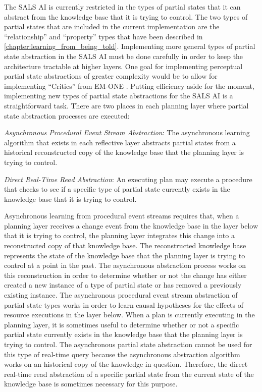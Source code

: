 The SALS AI is currently restricted in the types of partial states
that it can abstract from the knowledge base that it is trying to
control.  The two types of partial states that are included in the
current implementation are the ``relationship'' and ``property'' types
that have been described in
{\mbox{\autoref{chapter:learning_from_being_told}}}.
Implementing more general types of partial state abstraction in the
SALS AI must be done carefully in order to keep the architecture
tractable at higher layers.  One goal for implementing perceptual
partial state abstractions of greater complexity would be to allow for
implementing ``Critics'' from EM-ONE \cite[]{singh:2005b}.  Putting
efficiency aside for the moment, implementing new types of partial
state abstractions for the SALS AI is a straightforward task.  There
are two places in each planning layer where partial state abstraction
processes are executed:
\begin{packed_enumerate}
\item{\emph{Asynchronous Procedural Event Stream Abstraction}: The
  asynchronous learning algorithm that exists in each reflective layer
  abstracts partial states from a historical reconstructed copy of the
  knowledge base that the planning layer is trying to control.}
\item{\emph{Direct Real-Time Read Abstraction}: An executing plan may
  execute a procedure that checks to see if a specific type of partial
  state currently exists in the knowledge base that it is trying to
  control.}
\end{packed_enumerate}
Asynchronous learning from procedural event streams requires that,
when a planning layer receives a change event from the knowledge base
in the layer below that it is trying to control, the planning layer
integrates this change into a reconstructed copy of that knowledge
base.  The reconstructed knowledge base represents the state of the
knowledge base that the planning layer is trying to control at a point
in the past.  The asynchronous abstraction process works on this
reconstruction in order to determine whether or not the change has
either created a new instance of a type of partial state or has
removed a previously existing instance.  The asynchronous procedural
event stream abstraction of partial state types works in order to
learn causal hypotheses for the effects of resource executions in the
layer below.  When a plan is currently executing in the planning
layer, it is sometimes useful to determine whether or not a specific
partial state currently exists in the knowledge base that the planning
layer is trying to control.  The asynchronous partial state
abstraction cannot be used for this type of real-time query because
the asynchronous abstraction algorithm works on an historical copy of
the knowledge in question.  Therefore, the direct real-time read
abstraction of a specific partial state from the current state of the
knowledge base is sometimes necessary for this purpose.

